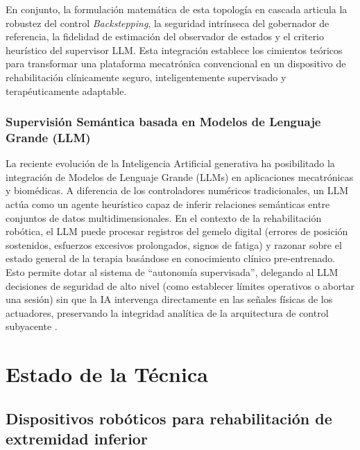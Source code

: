 \documentclass[a4paper,12pt]{article}
\begin{document}
En conjunto, la formulación matemática de esta topología en cascada articula la robustez del control \textit{Backstepping}, la seguridad intrínseca del gobernador de referencia, la fidelidad de estimación del observador de estados y el criterio heurístico del supervisor LLM. Esta integración establece los cimientos teóricos para transformar una plataforma mecatrónica convencional en un dispositivo de rehabilitación clínicamente seguro, inteligentemente supervisado y terapéuticamente adaptable.

\subsubsection{Supervisión Semántica basada en Modelos de Lenguaje Grande (LLM)}
La reciente evolución de la Inteligencia Artificial generativa ha posibilitado la integración de Modelos de Lenguaje Grande (LLMs) en aplicaciones mecatrónicas y biomédicas. A diferencia de los controladores numéricos tradicionales, un LLM actúa como un agente heurístico capaz de inferir relaciones semánticas entre conjuntos de datos multidimensionales. En el contexto de la rehabilitación robótica, el LLM puede procesar registros del gemelo digital (errores de posición sostenidos, esfuerzos excesivos prolongados, signos de fatiga) y razonar sobre el estado general de la terapia basándose en conocimiento clínico pre-entrenado. Esto permite dotar al sistema de ``autonomía supervisada'', delegando al LLM decisiones de seguridad de alto nivel (como establecer límites operativos o abortar una sesión) sin que la IA intervenga directamente en las señales físicas de los actuadores, preservando la integridad analítica de la arquitectura de control subyacente \citep{rifai2024upper}.

\newpage

\section{Estado de la Técnica}

\subsection{Dispositivos robóticos para rehabilitación de extremidad inferior}
\end{document}

